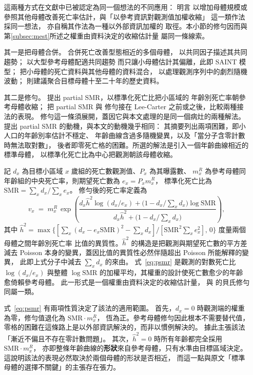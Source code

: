 \documentclass[UTF8, fontset=macnew, a4paper, 12pt]{ctexart}
\begin{document}
這兩種方式在文獻中已被認定為同一個想法的不同應用：\citet{wang2018} 明言
以增加母體規模或參照其他母體改善死亡率估計，與「以參考資訊對觀測值加權收縮」
這一類作法採同一想法，\citet{ahcan2014} 亦自稱其作法為一種以外部資訊加權的
取徑。本小節的修勻因而與第\ref{subsec:mest}所述之權重由資料決定的收縮估計量
屬同一條線索。

其一是把母體合併。\citet{lilee2005} 合併死亡改善型態相近的多個母體，
以共同因子描述其共同趨勢；\citet{jarner2011} 以大型參考母體配適共同趨勢
而只讓小母體估計其偏離，此即 SAINT 模型；
\citet{ahcan2014} 把小母體的死亡資料與其他母體的資料混合，
以處理觀測序列中的劇烈隨機波動；
\citet{wang2018} 則建議聚合目標母體十至二十年的歷史資料。

其二是修勻。\citet{lee2003} 提出 partial SMR，以標準化死亡比把小區域的
年齡別死亡率朝參考母體收縮；\citet{yue2019} 把 partial SMR 與
\citet{whittaker1923} 修勻接在 Lee-Carter 之前或之後，比較兩種接法的表現。
修勻這一條須展開，蓋因它與本文處理的是同一個病灶的兩種解法。
\citet{lee2003} 提出 partial SMR 的動機，與本文的動機幾乎相同：
其摘要列出兩項困難，即小人口的年齡別率估計不穩定、
年齡曲線含過多隨機變異，以及「當分子含零計數時無法取對數」，
後者即零死亡格的困難。所選的解法是引入一個年齡曲線相近的標準母體，
以標準化死亡比為中心把觀測朝該母體收縮。

記 $d_x$ 為目標小區域 $x$ 歲組的死亡數觀測值、$P_x$ 為其曝露數、
$m^R_x$ 為參考母體同年齡組的中央死亡率，則期望死亡數為 $e_x=P_x m^R_x$，
標準化死亡比為 $\mathrm{SMR}=\sum_x d_x\big/\sum_x e_x$。
修勻後的死亡率定義為
\begin{equation}\label{eq:psmr}
v_x \;=\; m^R_x\,\exp\!\left(
\frac{d_x\hat h^2\log(d_x/e_x)+\bigl(1-d_x/\textstyle\sum_x d_x\bigr)\log \mathrm{SMR}}
     {d_x\hat h^2+\bigl(1-d_x/\textstyle\sum_x d_x\bigr)}\right),
\end{equation}
其中 $\hat h^2=\max\bigl\{[\sum_x(d_x-e_x\mathrm{SMR})^2-\sum_x d_x]
\big/[\mathrm{SMR}^2\sum_x e_x^2],\,0\bigr\}$ 度量兩個母體之間年齡別死亡率
比值的異質性。$\hat h^2$ 的構造是把觀測與期望死亡數的平方差減去 Poisson
本身的變異，蓋因比值的異質性必然伴隨超出 Poisson 所能解釋的變異，
此即上式分子中減去 $\sum_x d_x$ 的來由。
式~\eqref{eq:psmr} 是觀測的對數死亡比 $\log(d_x/e_x)$ 與整體
$\log\mathrm{SMR}$ 的加權平均，其權重的設計使死亡數愈少的年齡愈倚賴參考母體。
此一形式是一個權重由資料決定的收縮估計量，
與 \citet{kimeldorf1967} 的貝氏修勻同屬一類。

式~\eqref{eq:psmr} 有兩項性質決定了該法的適用範圍。
首先，$d_x=0$ 時觀測端的權重為零，修勻值退化為 $\mathrm{SMR}\cdot m^R_x$，
恆為正。參考母體修勻因此根本不需要替代值，
零格的困難在這條路上是以外部資訊解決的，而非以慣例解決的。
\citet{lee2003} 據此主張該法「漸近不偏且不存在零計數問題」。
其次，$\hat h^2=0$ 時所有年齡都完全採用 $\mathrm{SMR}\cdot m^R_x$，
亦即整條年齡曲線的\textbf{形狀}來自參考母體，只有水準由目標區域決定。
這說明該法的表現必然取決於兩個母體的形狀是否相近，
而這一點與原文「標準母體的選擇不關鍵」的主張存在張力。
\end{document}
